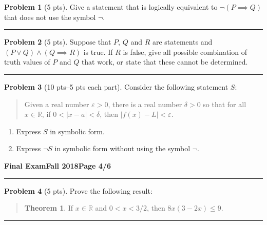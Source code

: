 \documentclass[11pt]{article}
\theoremstyle{definition}
\newtheorem{problem}{Problem}
\theoremstyle{theorem}
\newtheorem*{theorem}{Theorem}
\begin{document}
\begin{problem}[5 pts]
  Give a statement that is logically equivalent to $\lnot (P \implies Q)$ that does not use the symbol $\lnot$.

  \vspace{3cm}
\end{problem}
\hrule

\begin{problem}[5 pts]
  Suppose that $P$, $Q$ and $R$ are statements and $(P \lor Q) \land (Q \implies R)$ is true.  If $R$ is false, give all
  possible combination of truth values of $P$ and $Q$ that work, or state that these cannot be determined.

  \vspace{4cm}
\end{problem}
\hrule

\begin{problem}[10 pts--5 pts each part]
  Consider the following statement $S$:
  \begin{quote}
    Given a real number $\varepsilon > 0$, there is a real number $\delta>0$ so that for all $x \in \mathbb{R}$, if $ 0
    < \lvert x-a \rvert < \delta$, then $\lvert f(x) - L \rvert < \varepsilon$.
  \end{quote}
  \begin{enumerate}
  \item Express $S$ in symbolic form.
    \vspace{3cm}
  \item Express $\lnot S$ in symbolic form without using the symbol $\lnot$.
  \end{enumerate}
\end{problem}
\newpage

\hfill{\large\bf Final Exam}\hfill{\large\bf Fall 2018}\hfill{\large\bf Page 4/6}\hrule

\bigskip
\begin{problem}[5 pts]
  Prove the following result:
  \vspace{-0.75cm}
  \begin{quotation}
    \begin{theorem}
      If $x \in \mathbb{R}$ and $0 < x < 3/2$, then $8x(3-2x) \leq 9$.
    \end{theorem}
  \end{quotation}

  \vspace{9cm}
\end{problem}
\hrule
\end{document}
